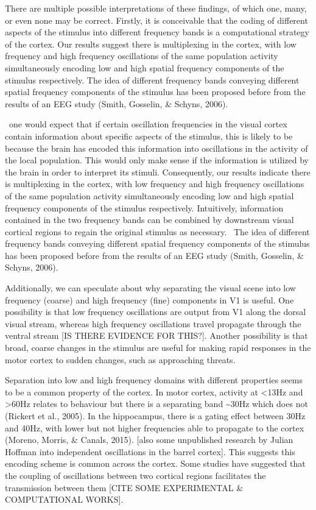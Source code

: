 \documentclass{article}
\begin{document}
There are multiple possible interpretations of these findings, of which one, many, or even none may be correct. Firstly, it is conceivable that the coding of different aspects of the stimulus into different frequency bands is a computational strategy of the cortex. Our results suggest there is multiplexing in the cortex, with low frequency and high frequency oscillations of the same population activity simultaneously encoding low and high spatial frequency components of the stimulus respectively. The idea of different frequency bands conveying different spatial frequency components of the stimulus has been proposed before from the results of an EEG study (Smith, Gosselin, \& Schyns, 2006).

\ one would expect that if certain oscillation frequencies in the visual cortex contain information about specific aspects of the stimulus, this is likely to be because the brain has encoded this information into oscillations in the activity of the local population. This would only make sense if the information is utilized by the brain in order to interpret its stimuli. Consequently, our results indicate there is multiplexing in the cortex, with low frequency and high frequency oscillations of the same population activity simultaneously encoding low and high spatial frequency components of the stimulus respectively. Intuitively, information contained in the two frequency bands can be combined by downstream visual cortical regions to regain the original stimulus as necessary. \ The idea of different frequency bands conveying different spatial frequency components of the stimulus has been proposed before from the results of an EEG study (Smith, Gosselin, \& Schyns, 2006).

Additionally, we can speculate about why separating the visual scene into low frequency (coarse) and high frequency (fine) components in V1 is useful. One possibility is that low frequency oscillations are output from V1 along the dorsal visual stream, whereas high frequency oscillations travel propagate through the ventral stream [IS THERE EVIDENCE FOR THIS?]. Another possibility is that broad, coarse changes in the stimulus are useful for making rapid responses in the motor cortex to sudden changes, such as approaching threats.

Separation into low and high frequency domains with different properties seems to be a common property of the cortex. In motor cortex, activity at {\textless}13Hz and {\textgreater}60Hz relates to behaviour but there is a separating band \~{}30Hz which does not (Rickert et al., 2005). In the hippocampus, there is a gating effect between 30Hz and 40Hz, with lower but not higher frequencies able to propagate to the cortex (Moreno, Morris, \& Canals, 2015). [also some unpublished research by Julian Hoffman into independent oscillations in the barrel cortex]. This suggests this encoding scheme is common across the cortex. Some studies have suggested that the coupling of oscillations between two cortical regions facilitates the transmission between them [CITE SOME EXPERIMENTAL \& COMPUTATIONAL WORKS].
\end{document}
